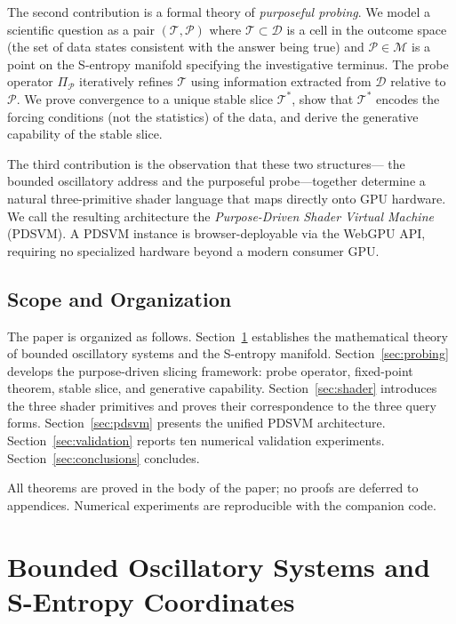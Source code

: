 \documentclass[10pt,twocolumn]{article}
\newcommand{\ProbeOp}{\Pi_\mathcal{P}}
\newcommand{\TruthCell}{\mathcal{T}}
\newcommand{\PurposePoint}{\mathcal{P}}
\newcommand{\DataSpace}{\mathcal{D}}
\newcommand{\ManifoldM}{\mathcal{M}}
\begin{document}
The second contribution is a formal theory of \emph{purposeful probing}.
We model a scientific question as a pair $(\TruthCell, \PurposePoint)$
where $\TruthCell \subset \DataSpace$ is a cell in the outcome space
(the set of data states consistent with the answer being true)
and $\PurposePoint \in \ManifoldM$ is a point on the S-entropy manifold
specifying the investigative terminus.
The probe operator $\ProbeOp$ iteratively refines $\TruthCell$ using
information extracted from $\DataSpace$ relative to $\PurposePoint$.
We prove convergence to a unique stable slice $\TruthCell^*$,
show that $\TruthCell^*$ encodes the forcing conditions (not the statistics)
of the data, and derive the generative capability of the stable slice.

The third contribution is the observation that these two structures---
the bounded oscillatory address and the purposeful probe---together
determine a natural three-primitive shader language that maps directly
onto GPU hardware. We call the resulting architecture the
\emph{Purpose-Driven Shader Virtual Machine} (PDSVM).
A PDSVM instance is browser-deployable via the WebGPU API,
requiring no specialized hardware beyond a modern consumer GPU.

\subsection{Scope and Organization}

The paper is organized as follows.
Section~\ref{sec:bos} establishes the mathematical theory of bounded oscillatory
systems and the S-entropy manifold.
Section~\ref{sec:probing} develops the purpose-driven slicing framework:
probe operator, fixed-point theorem, stable slice, and generative capability.
Section~\ref{sec:shader} introduces the three shader primitives and proves
their correspondence to the three query forms.
Section~\ref{sec:pdsvm} presents the unified PDSVM architecture.
Section~\ref{sec:validation} reports ten numerical validation experiments.
Section~\ref{sec:conclusions} concludes.

All theorems are proved in the body of the paper; no proofs are deferred
to appendices. Numerical experiments are reproducible with the companion code.

\section{Bounded Oscillatory Systems and S-Entropy Coordinates}
\label{sec:bos}
\end{document}
